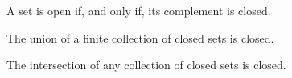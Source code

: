 
\begin{thm}{}{}
	A set is open if, and only if, its complement is closed.
\end{thm}

\begin{cor}{}{}
	The union of a finite collection of closed sets is closed.
\end{cor}

\begin{cor}{}{}
	The intersection of any collection of closed sets is closed.
\end{cor}
